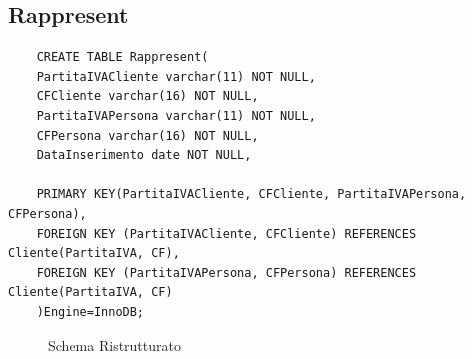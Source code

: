\documentclass{elegantbook}
\begin{document}
\subsection{Rappresent}
\begin{verbatim}
	CREATE TABLE Rappresent(
	PartitaIVACliente varchar(11) NOT NULL,
	CFCliente varchar(16) NOT NULL,
	PartitaIVAPersona varchar(11) NOT NULL,
	CFPersona varchar(16) NOT NULL,
	DataInserimento date NOT NULL,
	
	PRIMARY KEY(PartitaIVACliente, CFCliente, PartitaIVAPersona, CFPersona),
	FOREIGN KEY (PartitaIVACliente, CFCliente) REFERENCES Cliente(PartitaIVA, CF),
	FOREIGN KEY (PartitaIVAPersona, CFPersona) REFERENCES Cliente(PartitaIVA, CF)
	)Engine=InnoDB;
\end{verbatim}
\begin{figure}[H]
	\centering
	\caption{Schema Ristrutturato}
\end{figure}
\end{document}
